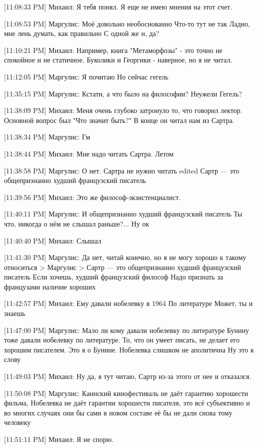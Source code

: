 \documentclass{article}
\begin{document}
{[11:08:33 PM] Михаил:
Я тебя понял. Я еще не имею мнения на этот счет.

[11:08:53 PM] Маргулис:
Моё довольно необоснованно
 Что-то тут не так
 Ладно, мне лень думать, как правильно
 С одной же н, да?

[11:10:21 PM] Михаил:
Например, книга "Метаморфозы" - это точно не спокойное и не статичное.
 Буколики и Георгики - наверное, но я не читал.

[11:12:05 PM] Маргулис:
Я почитаю
 Но сейчас гегель

[11:35:15 PM] Маргулис:
Кстати, а что было на философии?
 Неужели Гегель?

[11:38:09 PM] Михаил:
Меня очень глубоко затронуло то, что говорил лектор. Основной вопрос был "Что значит быть?"
 В конце он читал нам из Сартра.

[11:38:34 PM] Маргулис:
Гм

[11:38:44 PM] Михаил:
Мне надо читать Сартра.
 Летом

[11:38:58 PM] Маргулис:
О нет. Сартра не нужно читать
edited 
Сартр — это общепризнанно худший французский писатель

[11:39:56 PM] Михаил:
Это же философ-экзистенциалист.

[11:40:11 PM] Маргулис:
И общепризнанно худший французский писатель
 Ты что, никогда о нём не слышал раньше?...
 Ну ок

[11:40:40 PM] Михаил:
Слышал

[11:41:30 PM] Маргулис:
Да нет, читай конечно, но я не могу хорошо к такому относиться
> Маргулис
> Сартр — это общепризнанно худший французский писатель
Если хочешь, худший французский философ
 Надо признать за французами наличие хороших

[11:42:57 PM] Михаил:
Ему давали нобелевку в 1964
 По литературе
 Может, ты и знаешь

[11:47:00 PM] Маргулис:
Мало ли кому давали нобелевку по литературе
 Бунину тоже давали нобелевку по литературе. То, что он умеет писать, не делает его хорошим писателем. Это я о Бунине.
 Нобелевка слишком не аполитична
 Ну это к слову

[11:49:03 PM] Михаил:
Ну да, я тут читаю, Сартр из-за этого от нее и отказался.

[11:50:08 PM] Маргулис:
Каннский кинофестиваль не даёт гарантию хорошести фильма, Нобелевка не даёт гарантии хорошести писателя, это всё субъективно и во многих случаях они бы сами в новом составе её бы не дали снова тому человеку

[11:51:11 PM] Михаил:
Я не спорю.

}
\end{document}
